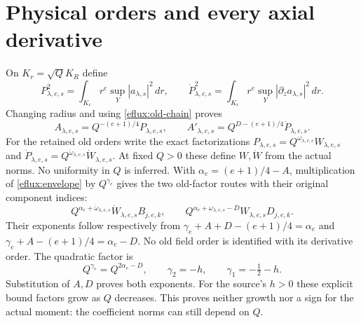 \section{Physical orders and every axial derivative}
\label{eflux:orders-section}
On $K_r=\sqrt QK_R$ define
\[
P_{\lambda,e,s}^2=\int_{K_r}r^e\sup_Y|a_{\lambda,s}|^2\,dr,\qquad
\dot P_{\lambda,e,s}^2=\int_{K_r}r^e
\sup_Y|\partial_za_{\lambda,s}|^2\,dr .
\]
Changing radius and using \eqref{eflux:old-chain} proves
\begin{equation}
A_{\lambda,e,s}=Q^{-(e+1)/4}P_{\lambda,e,s},\qquad
A'_{\lambda,e,s}=Q^{D-(e+1)/4}\dot P_{\lambda,e,s}.
\label{eflux:physical-norms}
\end{equation}
For the retained old orders write the exact factorizations
$P_{\lambda,e,s}=Q^{\omega_{\lambda,e,s}}W_{\lambda,e,s}$ and
$\dot P_{\lambda,e,s}=Q^{\dot\omega_{\lambda,e,s}}\dot W_{\lambda,e,s}$.
At fixed $Q>0$ these define $W,\dot W$ from the actual norms.
No uniformity in $Q$ is inferred. With $\alpha_e=(e+1)/4-A$,
multiplication of \eqref{eflux:envelope} by $Q^{\gamma_e}$ gives the
two old-factor routes with their original component indices:
\begin{equation}
Q^{\alpha_e+\dot\omega_{\lambda,e,s}}\dot W_{\lambda,e,s}B_{j,e,k},
\qquad
Q^{\alpha_e+\omega_{\lambda,e,s}-D}W_{\lambda,e,s}D_{j,e,k}.
\label{eflux:old-orders}
\end{equation}
Their exponents follow respectively from
$\gamma_e+A+D-(e+1)/4=\alpha_e$ and
$\gamma_e+A-(e+1)/4=\alpha_e-D$.
No old field order is identified with its derivative order.
The quadratic factor is
\begin{equation}
Q^{\gamma_e}=Q^{2\alpha_e-D},\qquad
\gamma_2=-h,\qquad\gamma_1=-\tfrac12-h .
\label{eflux:quadratic-orders}
\end{equation}
Substitution of $A,D$ proves both exponents.
For the source's $h>0$ these explicit bound factors grow as $Q$
decreases. This proves neither growth nor a sign for the actual
moment: the coefficient norms can still depend on $Q$.

